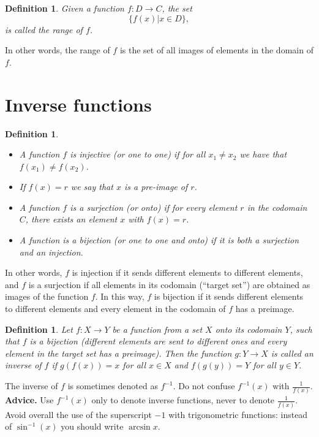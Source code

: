 \documentclass[12pt]{book}
\newtheorem{definition}[theorem]{Definition}
\begin{document}
\begin{definition}
Given a function $f:D\to C$, the set 
\[
 \{f(x) | x\in D \},
\]
is called the \emph{range} of $f$. 
\end{definition}
In other words, the range of $f$ is the set of all images of elements in the domain of $f$.
\section{Inverse functions}

\begin{definition} ~
\begin{itemize}
\item {} A function $f$ is \emph{injective (or one to one)} if  for all $x_1\neq x_2$ we have that $f(x_1)\neq f(x_2)$. 
\item {} If $f(x)=r$ we say that $x$ is a \emph{pre-image} of $r$.
\item {}
A function $f$ is a \emph{surjection (or onto)} if for every element $r$ in the codomain $C$, there exists an element $x$ with $f(x)=r$.
\item {} A function is a \emph{bijection (or one to one and onto)} if it is both a surjection and an injection.
\end{itemize}
\end{definition}
In other words, $f$ is injection if it sends different elements to different elements, and $f$ is a surjection if all elements in its  codomain (``target set'') are obtained as images of the function $f$. In this way, $f$ is bijection if it sends different elements to different elements and every element in the codomain of $f$ has a preimage.
\begin{definition}
Let $f:X\to Y$ be a function from a set $X$ onto its codomain $Y$, such that $f$ is a bijection (different elements are sent to different ones and every element in the target set has a preimage). Then the function $g: Y\to X$ is called an inverse of $f$ if $g(f(x))=x$ for all $x\in X$ and $f(g(y))=Y$ for all $y\in Y$. 
\end{definition}

The inverse of $f$ is sometimes denoted as $f^{-1}$. Do not confuse $f^{-1}(x)$ with $\frac{1}{f(x)}$. \textbf{Advice.} Use $f^{-1}(x)$ only to denote inverse functions, never to denote $\frac{1}{f(x)}$. Avoid overall the use of the superscript $-1$ with trigonometric functions: instead of  $\sin^{-1}(x)$ you should write $\arcsin x$.
\end{document}
